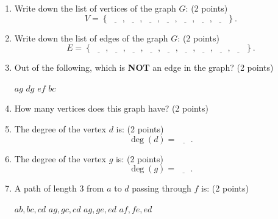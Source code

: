 \documentclass[12pt]{exam}
\begin{document}
\begin{enumerate}
\begin{figure}[h!]
\begin{tikzpicture}[x=0.75pt,y=0.75pt,yscale=-1,xscale=1]
    
    \end{tikzpicture}
    

    
\end{figure}

\begin{enumerate}
    \item \label{firstQnSec1} Write down the list of vertices of the graph $G$: (2 points)
    \vspace{0.5em}
    $$V=\left\lbrace\underline{\phantom{ans}},\underline{\phantom{ans}},\underline{\phantom{ans}},\underline{\phantom{ans}},\underline{\phantom{ans}},\underline{\phantom{ans}},\underline{\phantom{ans}}\right\rbrace.$$
    \vfill
    \item Write down the list of edges of the graph $G$: (2 points)
    \vspace{0.5em}
    $$E=\left\lbrace\underline{\phantom{ans}},\underline{\phantom{ans}},\underline{\phantom{ans}},\underline{\phantom{ans}},\underline{\phantom{ans}},\underline{\phantom{ans}},\underline{\phantom{ans}},\underline{\phantom{ans}},\underline{\phantom{ans}}\right\rbrace.$$
    \vfill
    \item Out of the following, which is \textbf{NOT} an edge in the graph? (2 points)
    \begin{checkboxes}
        \choice $ag$
        \choice $dg$
        \choice $ef$
        \choice $bc$
    \end{checkboxes}
    \vfill
    \item How many vertices does this graph have? (2 points)
    \begin{checkboxes}
    \end{checkboxes}
    \vfill
    \newpage
    \item The degree of the vertex $d$ is: (2 points)
    \vspace{0.5em}
    $$\deg(d)=\underline{\phantom{ans}}.$$
    \vfill
    \item The degree of the vertex $g$ is: (2 points)
    \vspace{0.5em}
    $$\deg(g)=\underline{\phantom{ans}}.$$
    \vfill
    \item A path of length $3$ from $a$ to $d$ passing through $f$ is: (2 points)
    \begin{checkboxes}
        \choice $ab,bc,cd$
        \choice $ag,gc,cd$
        \choice $ag,ge,ed$
        \choice $af,fe,ed$
    \end{checkboxes}

\end{enumerate}
\end{enumerate}
\end{document}
